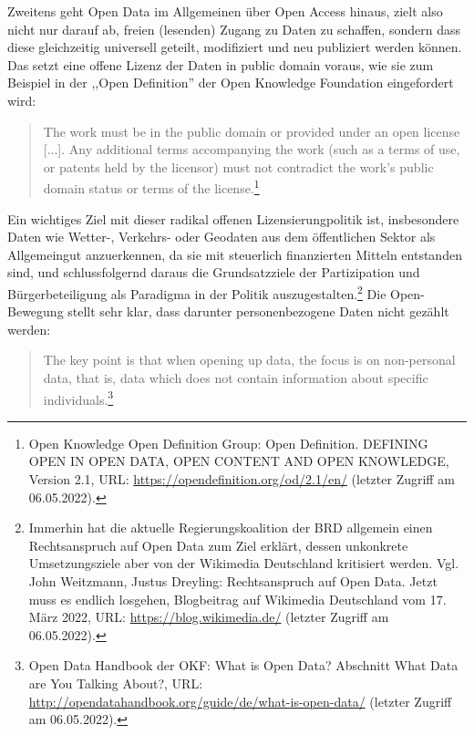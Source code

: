 Zweitens geht Open Data im Allgemeinen über Open Access hinaus, zielt also nicht nur darauf ab, freien (lesenden) Zugang zu Daten zu schaffen, sondern dass diese gleichzeitig universell geteilt, modifiziert und neu publiziert werden können. Das setzt eine offene Lizenz der Daten in public domain voraus, wie sie zum Beispiel in der ,,Open Definition'' der Open Knowledge Foundation eingefordert wird:

\begin{quote}
The work must be in the public domain or provided under an open license [...]. Any additional terms accompanying the work (such as a terms of use, or patents held by the licensor) must not contradict the work’s public domain status or terms of the license.\footnote{Open Knowledge Open Definition Group: Open Definition. DEFINING OPEN IN OPEN DATA, OPEN CONTENT AND OPEN KNOWLEDGE, Version 2.1, URL: \url{https://opendefinition.org/od/2.1/en/} (letzter Zugriff am 06.05.2022).}
\end{quote}

Ein wichtiges Ziel mit dieser radikal offenen Lizensierungpolitik ist, insbesondere Daten wie Wetter-, Verkehrs- oder Geodaten aus dem öffentlichen Sektor als Allgemeingut anzuerkennen, da sie mit steuerlich finanzierten Mitteln entstanden sind, und schlussfolgernd daraus die Grundsatzziele der Partizipation und Bürgerbeteiligung als Paradigma in der Politik auszugestalten.\footnote{Immerhin hat die aktuelle Regierungskoalition der BRD allgemein einen Rechtsanspruch auf Open Data zum Ziel erklärt, dessen unkonkrete Umsetzungsziele aber von der Wikimedia Deutschland kritisiert werden. Vgl. John Weitzmann, 
Justus Dreyling: Rechtsanspruch auf Open Data. Jetzt muss es endlich losgehen, Blogbeitrag auf Wikimedia Deutschland vom 17. März 2022, URL: \url{https://blog.wikimedia.de/} (letzter Zugriff am 06.05.2022).} Die Open-Bewegung stellt sehr klar, dass darunter personenbezogene Daten nicht gezählt werden:

\begin{quote}
The key point is that when opening up data, the focus is on non-personal data, that is, data which does not contain information about specific individuals.\footnote{Open Data Handbook der OKF: What is Open Data? Abschnitt What Data are You Talking About?, URL: \url{http://opendatahandbook.org/guide/de/what-is-open-data/} (letzter Zugriff am 06.05.2022).}
\end{quote} 

